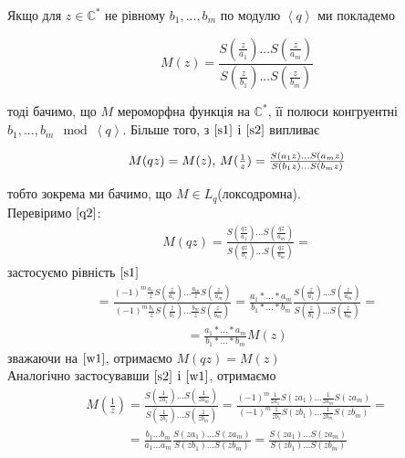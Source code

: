 \documentclass[12pt,a4paper]{article}
\begin{document}
Якщо для $z \in \mathbb{C}^{*}$ не рівному $b_{1},...,b_{m}$ по модулю $\left \langle q \right \rangle $ ми покладемо
\begin{center}
\[ M(z)=\frac{S(\frac{z}{a_{1}})...S(\frac{z}{a_{m}})}{S(\frac{z}{b_{1}})...S(\frac{z}{b_{m}})}\]
\end{center}
тоді бачимо, що $M$ мероморфна функція на $\mathbb{C}^{*}$, її полюси конгруентні $b_{1},...,b_{m}\mod \left \langle q \right \rangle $. Більше того, з $\eqref{s1}$ і $\eqref{s2}$ випливає

\begin{equation}\label{q2}
\begin{array}{l} 
 M(qz)=M(z)$,  $M(\frac{1}{z})=\frac{S(a_{1}z)...S(a_{m}z)}{S(b_{1}z)...S(b_{m}z)}     
\end{array}
\end{equation}  
 
тобто зокрема ми бачимо, що $M\in L_{q}$(локсодромна).\\
Перевіримо $\eqref{q2}$:\\  
 \[\begin{array}{l}
 M(qz)=\frac{S(\frac{qz}{a_{1}})...S(\frac{qz}{a_{m}})}{S(\frac{qz}{b_{1}})...S(\frac{qz}{b_{m}})}=
 \end{array}\]
 застосуємо рівність $\eqref{s1}$
\[\begin{array}{l}
=\frac{ (-1)^{m} \frac{a_{1}}{z} S(\frac{z}{a_{1}})...\frac{a_{m}}{z} S(\frac{z}{a_{m}}) }{ (-1)^{m} \frac{b_{1}}{z} S(\frac{z}{b_{1}})...\frac{b_{m}}{z} S(\frac{z}{b_{m}}) }

=\frac{ a_{1}*...*a_{m}}{b_{1}*...*b_{m}}\frac{S(\frac{z}{a_{1}})...S(\frac{z}{a_{m}})}{S(\frac{z}{b_{1}})...S(\frac{z}{b_{m}})}=
\end{array}\]
\[\begin{array}{l}
=\frac{ a_{1}*...*a_{m}}{b_{1}*...*b_{m}}M(z) 
\end{array}\]
зважаючи на $\eqref{w1}$, отримаємо
$M(qz)=M(z)$\\

Аналогічно застосувавши $\eqref{s2}$ і $\eqref{w1}$, отримаємо\\
\[\begin{array}{l}
M(\frac{1}{z})=\frac{S(\frac{1}{za_{1}})...S(\frac{1}{za_{m}})}{S(\frac{1}{zb_{1}})...S(\frac{1}{zb_{m}})}= 
\frac{(-1)^m \frac{1}{za_{1}} S(za_{1})...\frac{1}{za_{m}} S(za_{m})}{(-1)^m \frac{1}{zb_{1}} S(zb_{1})...\frac{1}{zb_{m}} S(zb_{m})}=
\end{array}\]
\[\begin{array}{l}
= \frac{b_{1}...b_{m}}{a_{1}...a_{m}}
\frac{ S(za_{1})...S(za_{m})}{S(zb_{1})...S(zb_{m})}=\frac{ S(za_{1})...S(za_{m})}{S(zb_{1})...S(zb_{m})}  
\end{array} \]
\[\begin{array}{l}
\end{array} \]
\end{document}
